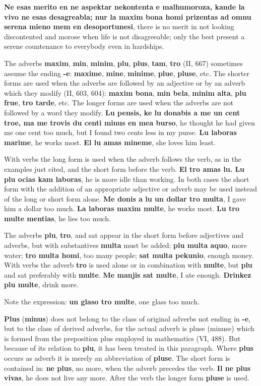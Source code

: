 \textbf{Ne esas merito en ne aspektar nekontenta e malhumoroza, kande la vivo ne esas desagreabla; nur la maxim bona homi prizentas ad omnu serena mieno mem en desoportunesi}, there is no merit in not looking discontented and morose when life is not disagreeable; only the best present a serene countenance to everybody even in hardships.

The adverbs \textbf{maxim}, \textbf{min}, \textbf{minim}, \textbf{plu}, \textbf{plus}, \textbf{tam}, \textbf{tro} (II, 667) sometimes assume the ending \textbf{-e}: \textbf{maxime}, \textbf{mine}, \textbf{minime}, \textbf{plue}, \textbf{pluse}, etc. The shorter forms are used when the adverbs are followed by an adjective or by an adverb which they modify (II, 603, 604): \textbf{maxim bona}, \textbf{min bela}, \textbf{minim alta}, \textbf{plu frue}, \textbf{tro tarde}, etc. The longer forms are used when the adverbs are not followed by a word they modify. \textbf{Lu pensis, ke lu donabis a me un cent troe, ma me trovis du centi minus en mea burso}, he thought he had given me one cent too much, but I found two cents less in my purse. \textbf{Lu laboras marime}, he works most. \textbf{El lu amas mineme}, she loves him least.

With verbs the long form is used when the adverb follows the verb, as in the examples just cited, and the short form before the verb. \textbf{El tro amas lu. Lu plu ocias kam laboras}, he is more idle than working. In both cases the short form with the addition of an appropriate adjective or adverb may be used instead of the long or short form alone. \textbf{Me donis a lu un dollar tro multa}, I gave him a dollar too much. \textbf{La laboras maxim multe}, he works most. \textbf{Lu tro multe mentias}, he lies too much.

The adverbs \textbf{plu}, \textbf{tro}, and sat appear in the short form before adjectives and adverbs, but with substantives \textbf{multa} must be added: \textbf{plu multa aquo}, more water; \textbf{tro multa homi}, too many people; \textbf{sat multa pekunio}, enough money. With verbs the adverb \textbf{tro} is used alone or in combination with \textbf{multe}, but \textbf{plu} and sat preferably with \textbf{multe}. \textbf{Me manjis sat multe}, I ate enough. \textbf{Drinkez plu multe}, drink more.

Note the expression: \textbf{un glaso tro multe}, one glass too much.

\textbf{Plus} (\textbf{minus}) does not belong to the class of original adverbs not ending in \textbf{-e}, but to the class of derived adverbs, for the actual adverb is pluse (minuse) which is formed from the preposition plus employed in mathematics (VI, 488). But because of its relation to \textbf{plu}, it has been treated in this paragraph. Where \textbf{plus} occurs as adverb it is merely an abbreviation of \textbf{pluse}. The short form is contained in: \textbf{ne plus}, no more, when the adverb precedes the verb. \textbf{Il ne plus vivas}, he does not live any more. After the verb the longer form \textbf{pluse} is used.

